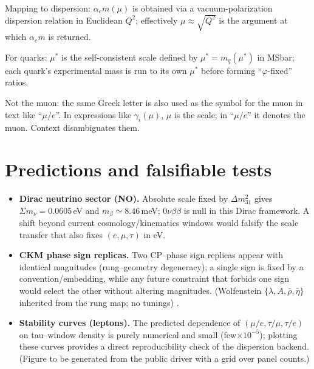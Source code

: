 \documentclass[%
 amsmath,amssymb,
 aps,
prb,
floatfix, showkeys
]{revtex4-2}
\begin{document}
 Mapping to dispersion: $\alpha_e m(\mu)$ is obtained via a vacuum-polarization dispersion
 relation in Euclidean $Q^2$; effectively $\mu \approx \sqrt{Q^2}$ is the argument at
 which  $\alpha_e m$ is returned.

 For quarks: $\mu^*$ is the self-consistent scale defined by $\mu^* = m_q(\mu^*)$ in MSbar;
 each quark’s experimental mass is run to its own
 $\mu^*$ before forming “$\varphi$-fixed” ratios.

 Not the muon: the same Greek letter is also used as the symbol for the muon in text like
 “$\mu/e$”. In expressions like $\gamma_i(\mu)$, $\mu$ is the scale;
 in “$\mu /e$” it denotes the muon. Context disambiguates them.















 
\section{Predictions and falsifiable tests}
\begin{itemize}
  \item \textbf{Dirac neutrino sector (NO).} Absolute scale fixed by $\Delta m^2_{31}$ gives $\Sigma m_\nu=0.0605$\,eV and $m_\beta\simeq 8.46$\,meV; $0\nu\beta\beta$ is null in this Dirac framework. A shift beyond current cosmology/kinematics windows would falsify the scale transfer that also fixes $(e,\mu,\tau)$ in eV.
  \item \textbf{CKM phase sign replicas.} Two CP–phase sign replicas appear with identical magnitudes (rung–geometry degeneracy); a single sign is fixed by a convention/embedding, while any future constraint that forbids one sign would select the other without altering magnitudes. (Wolfenstein $\{\lambda,A,\bar\rho,\bar\eta\}$ inherited from the rung map; no tunings) \cite{Wolfenstein1983,PDG2024}.
  \item \textbf{Stability curves (leptons).} The predicted dependence of $(\mu/e,\tau/\mu,\tau/e)$ on tau--window density is purely numerical and small (few$\times10^{-5}$); plotting these curves provides a direct reproducibility check of the dispersion backend. (Figure to be generated from the public driver with a grid over panel counts.)
\end{itemize}
\end{document}
